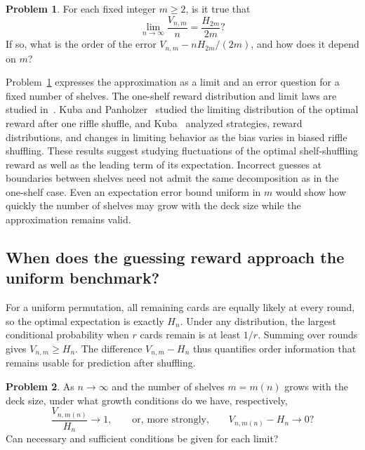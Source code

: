 \documentclass[11pt,reqno]{amsart}
\numberwithin{equation}{section}
\theoremstyle{definition}
\newtheorem{problem}{Problem}
\theoremstyle{remark}
\begin{document}
\begin{problem}\label{prob:fixed}
For each fixed integer $m\ge2$, is it true that
\[
\lim_{n\to\infty}\frac{V_{n,m}}n=\frac{H_{2m}}{2m}?
\]
If so, what is the order of the error $V_{n,m}-nH_{2m}/(2m)$, and how does it depend on $m$?
\end{problem}

Problem~\ref{prob:fixed} expresses the approximation as a limit and an error question for a fixed number of shelves. The one-shelf reward distribution and limit laws are studied in~\cite{CKT}. Kuba and Panholzer~\cite{KP} studied the limiting distribution of the optimal reward after one riffle shuffle, and Kuba~\cite{KubaBias} analyzed strategies, reward distributions, and changes in limiting behavior as the bias varies in biased riffle shuffling. These results suggest studying fluctuations of the optimal shelf-shuffling reward as well as the leading term of its expectation. Incorrect guesses at boundaries between shelves need not admit the same decomposition as in the one-shelf case. Even an expectation error bound uniform in $m$ would show how quickly the number of shelves may grow with the deck size while the approximation remains valid.

\subsection{When does the guessing reward approach the uniform benchmark?}
For a uniform permutation, all remaining cards are equally likely at every round, so the optimal expectation is exactly $H_n$. Under any distribution, the largest conditional probability when $r$ cards remain is at least $1/r$. Summing over rounds gives $V_{n,m}\ge H_n$. The difference $V_{n,m}-H_n$ thus quantifies order information that remains usable for prediction after shuffling.

\begin{problem}\label{prob:growing}
As $n\to\infty$ and the number of shelves $m=m(n)$ grows with the deck size, under what growth conditions do we have, respectively,
\[
\frac{V_{n,m(n)}}{H_n}\longrightarrow1,
\qquad\text{or, more strongly,}\qquad
V_{n,m(n)}-H_n\longrightarrow0?
\]
Can necessary and sufficient conditions be given for each limit?
\end{problem}
\end{document}
